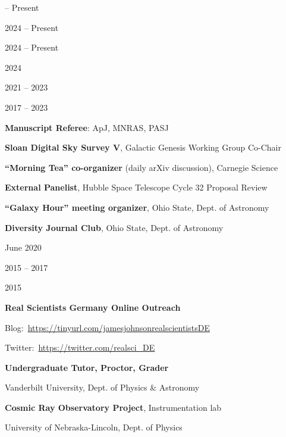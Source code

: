 \documentclass[cv.tex]{subfiles}
\begin{document}
\parbox{0.18\textwidth}{%
	 -- Present \par
	2024 -- Present \par
	2024 -- Present \par
	2024 \par
	2021 -- 2023 \par
	2017 -- 2023 \par
}
\hspace{1mm}
\parbox{0.8\textwidth}{%
	\vspace{1mm}
	\textbf{Manuscript Referee}: ApJ, MNRAS, PASJ \par
	\textbf{Sloan Digital Sky Survey V}, Galactic Genesis Working Group Co-Chair
	\par
	\textbf{``Morning Tea'' co-organizer} (daily arXiv discussion), Carnegie
	Science \par
	\textbf{External Panelist}, Hubble Space Telescope Cycle 32 Proposal Review
	\par
	\textbf{``Galaxy Hour'' meeting organizer}, Ohio State, Dept. of Astronomy
	\par
	\textbf{Diversity Journal Club}, Ohio State, Dept. of Astronomy \par
}

\newpage
\noindent
\parbox{0.18\textwidth}{%
	\raggedleft
	June 2020 \par
	\null \par
	\null \par
	2015 -- 2017 \par
	\null \par
	2015 \par
	\null \par
}
\hspace{1mm}
\parbox{0.8\textwidth}{%
	\textbf{Real Scientists Germany Online Outreach} \par
	Blog:~\url{https://tinyurl.com/jamesjohnsonrealscientistsDE} \par
	Twitter:~\url{https://twitter.com/realsci_DE} \par
	\textbf{Undergraduate Tutor, Proctor, Grader} \par
	Vanderbilt University, Dept. of Physics \& Astronomy \par
	\textbf{Cosmic Ray Observatory Project}, Instrumentation lab \par
	University of Nebraska-Lincoln, Dept. of Physics \par
}
\end{document}
